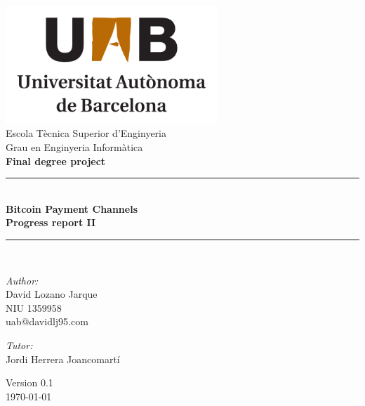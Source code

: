 \documentclass[a4paper,12pt,openany]{report}
\begin{document}

\begin{titlepage}
\begin{center}

\includegraphics[width=0.6\textwidth]{uab_logo}\\[1cm]

{\large Escola Tècnica Superior d'Enginyeria}\\[0.5cm]

{\large Grau en Enginyeria Informàtica}\\[0.5cm]

{\large \textbf{Final degree project}}\\[0.5cm]

\rule{\linewidth}{0.5mm} \\[0.4cm]
{ \huge \bfseries Bitcoin Payment Channels \\[0.4cm] }
{ \large \bfseries Progress report II}
\rule{\linewidth}{0.5mm} \\[1.5cm]

\noindent
\begin{minipage}{0.4\textwidth}
  \begin{flushleft} \large
    \emph{Author:}\\
    David Lozano Jarque\\
    NIU 1359958\\
    uab@davidlj95.com
  \end{flushleft}
\end{minipage}%
\begin{minipage}{0.4\textwidth}
  \begin{flushright} \large
    \emph{Tutor:} \\
    Jordi Herrera Joancomartí\\
  \end{flushright}
\end{minipage}

\vfill

{\large Version 0.1\\ \today}

\end{center}
\end{titlepage}
\end{document}
